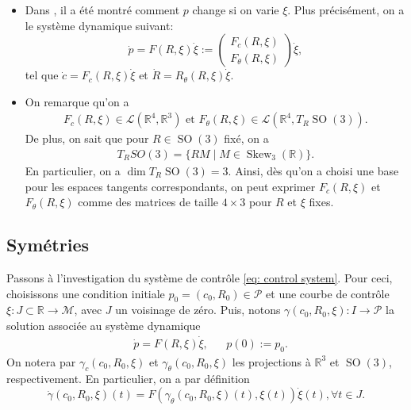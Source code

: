 \documentclass[10pt,a4paper]{article}
\theoremstyle{plain}
\theoremstyle{plain}
\theoremstyle{plain}
\theoremstyle{definition}
\theoremstyle{definition}
\theoremstyle{definition}
\theoremstyle{plain}
\newcommand{\M}{\mathcal{M}}
\newcommand{\R}{\mathbb{R}}
\DeclareMathOperator{\Skew}{Skew}
\DeclareMathOperator{\SO}{SO}
\begin{document}
\begin{itemize}
\item Dans \cite{Alouges2013}, il a été montré comment $p$ change si on varie $\xi$. Plus précisément, on a le système dynamique suivant:
\begin{equation}
\label{eq: control system}
	\dot{p} = F(R, \xi) \dot{\xi} := \left ( \begin{array}{c}
	F_c(R, \xi) \\
	F_\theta(R, \xi)
	\end{array}  \right ) \dot{\xi},
\end{equation}
tel que $\dot{c} = F_{c}(R, \xi) \dot{\xi}$ et $\dot{R} = R_{\theta}(R, \xi) \dot{\xi}$.

\item On remarque qu'on a
\begin{equation}
\begin{aligned}
	F_c(R, \xi) \in \mathcal{L}(\R^4, \R^3) \text{ et } F_{\theta}(R, \xi) \in \mathcal{L}(\R^4,T_R \SO(3)).
\end{aligned}
\end{equation}
De plus, on sait que pour $R \in \SO(3)$ fixé, on a
\begin{align}
T_{R}SO(3) = \{R M \mid M \in \Skew_3(\R)\}.
\end{align}
En particulier, on a $\dim T_R \SO(3) = 3$. Ainsi, dès qu'on a choisi une base pour les espaces tangents correspondants, on peut exprimer $F_{c}(R, \xi)$ et $F_{\theta}(R, \xi)$ comme des matrices de taille $4 \times 3$ pour $R$ et $\xi$ fixes.

\end{itemize}

\subsection{Symétries}
Passons à l'investigation du système de contrôle \ref{eq: control system}. Pour ceci, choisissons une condition initiale $p_0 = (c_0, R_0) \in \mathcal{P}$ et une courbe de contrôle $\xi: J \subset \R \to \M$, avec $J$ un voisinage de zéro. Puis, notons $\gamma(c_0, R_0, \xi): I \to \mathcal{P}$ la solution associée au système dynamique
\begin{equation}
\label{eq:dynamical system}
\begin{aligned}
	&\dot{p} = F(R, \xi) \dot{\xi},& & p(0) := p_0.
\end{aligned}
\end{equation}
On notera par $\gamma_c(c_0, R_0, \xi)$ et $\gamma_{\theta}(c_0, R_0, \xi)$ les projections à $\R^3$ et $\SO(3)$, respectivement. En particulier, on a par définition
\begin{equation}
	\dot{\gamma}(c_0, R_0, \xi)(t) = F(\gamma_\theta(c_0, R_0, \xi)(t), \xi(t))\dot{\xi}(t), \forall t \in J.
\end{equation}
\end{document}
